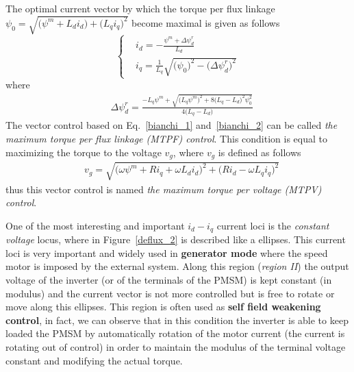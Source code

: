 \documentclass[11pt,a4paper]{article}
\numberwithin{equation}{section}
\theoremstyle{it}
\theoremstyle{definition}
\begin{document}
\begin{onehalfspace}
The optimal current vector by which the torque per flux linkage $\psi_0 = \sqrt{\Big(\psi^m+L_di_d \Big) + \Big(L_qi_q\Big)^2}$ become maximal is given as follows
\begin{equation}\label{bianchi_1}
	\left\lbrace \begin{aligned}
		&i_d=-\frac{\psi^m+\Delta \psi_d^r}{L_d} \\[6pt]
		&i_q=\frac{1}{L_q}\sqrt{\Big(\psi_0 \Big)^2-\Big(\Delta\psi_d^r \Big)^2}
	\end{aligned}\right. 
\end{equation}
where 
\begin{equation}\label{bianchi_2}
	\begin{aligned}
		&\Delta \psi_d^r = \frac{-L_q\psi^m+\sqrt{\Big(L_q\psi^m\Big)^2+8\Big(L_q-L_d\Big)^2\psi_0^2}}{4\big(L_q-L_d\big)}
	\end{aligned}
\end{equation}
The vector control based on Eq.~\eqref{bianchi_1} and~\ref{bianchi_2} can be called \textit{the maximum torque per flux linkage (MTPF) control}. This condition is equal to maximizing the torque to the voltage $v_g$, where  $v_g$ is defined as follows 
\begin{equation}\label{bianchi_3}
	\begin{aligned}
		&v_g = \sqrt{\Big(\omega\psi^m + Ri_q + \omega L_d i_d\Big)^2 + \Big(Ri_d - \omega L_q i_q\Big)^2}
	\end{aligned}
\end{equation}
thus this vector control is named \textit{the maximum torque per voltage (MTPV) control}. 

One of the most interesting and important $i_d-i_q$ current loci is the \textit{constant voltage} locus, where in Figure~\ref{deflux_2} is described like a ellipses. This current loci is very important and widely used in \textbf{generator mode} where the speed motor is imposed by the external system. Along this region (\textit{region II}) the output voltage of the inverter (or of the terminals of the PMSM) is kept constant (in modulus) and the current vector is not more controlled but is free to rotate or move along this ellipses. This region is often used as \textbf{self field weakening control}, in fact, we can observe that in this condition the inverter is able to keep loaded the PMSM by automatically rotation of the motor current (the current is rotating out of control) in order to maintain the modulus of the terminal voltage constant and modifying the actual torque.


\end{onehalfspace}
\end{document}
